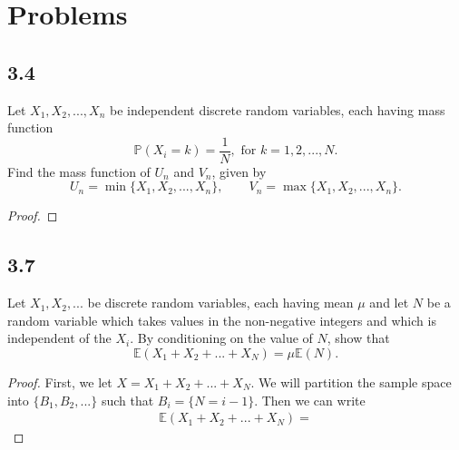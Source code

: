 \documentclass{article}
\renewcommand{\P}[1]{\mathbb{P}(#1)}
\newcommand{\E}[1]{\mathbb{E}(#1)}
\begin{document}
\section*{Problems}
\subsection*{3.4}
Let $X_1, X_2,...,X_n$ be independent discrete random variables, each having mass function
$$ \P{X_i = k} = \frac{1}{N}, \text{ for } k = 1,2,...,N.$$
Find the mass function of $U_n$ and $V_n$, given by
$$U_n= \min\{X_1,X_2,...,X_n\}, \qquad V_n= \max\{X_1,X_2,...,X_n\}.$$

\begin{proof}

\end{proof}
\subsection*{3.7}
Let $X_1, X_2,...$ be discrete random variables, each having mean $\mu$ and
let $N$ be a random variable which takes values in the non-negative integers
and which is independent of the $X_i$. By conditioning on the value of $N$, show that
$$\E{X_1 + X_2 + ... + X_N} = \mu\E{N}.$$

\begin{proof}
    First, we let $X = X_1 + X_2 + ... + X_N$.
    We will partition the sample space into $\{B_1, B_2,...\}$ such that
    $B_i = \{N = i - 1\}$. Then we can write
    \begin{align*}
        \E{X_1 + X_2 + ... + X_N} =
    \end{align*}
\end{proof}
\end{document}
